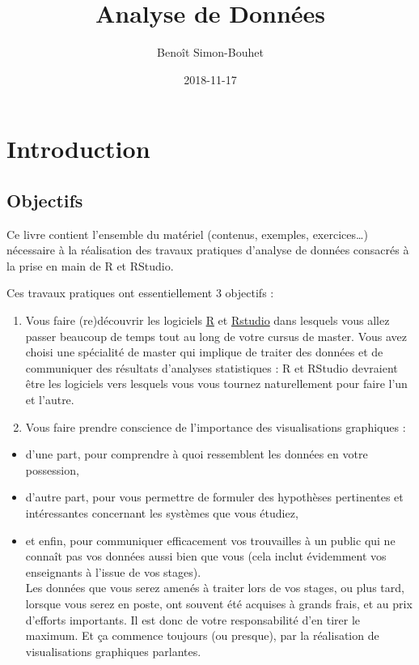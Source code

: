 \documentclass[a4paperpaper,]{article}
\title{Analyse de Données}
\author{Benoît Simon-Bouhet}
\date{2018-11-17}
\providecommand{\tightlist}{%
  \setlength{\itemsep}{0pt}\setlength{\parskip}{0pt}}
\theoremstyle{definition}
\theoremstyle{definition}
\theoremstyle{definition}
\theoremstyle{remark}
\begin{document}
\maketitle

{
\setcounter{tocdepth}{2}
\tableofcontents
}
\section{Introduction}\label{introduction}

\subsection{Objectifs}\label{objectifs}

Ce livre contient l'ensemble du matériel (contenus, exemples,
exercices\ldots{}) nécessaire à la réalisation des travaux pratiques
d'analyse de données consacrés à la prise en main de R et RStudio.

Ces travaux pratiques ont essentiellement 3 objectifs :

\begin{enumerate}
\def\labelenumi{\arabic{enumi}.}
\tightlist
\item
  Vous faire (re)découvrir les logiciels
  \href{https://cran.r-project.org}{R} et
  \href{https://www.rstudio.com}{Rstudio} dans lesquels vous allez
  passer beaucoup de temps tout au long de votre cursus de master. Vous
  avez choisi une spécialité de master qui implique de traiter des
  données et de communiquer des résultats d'analyses statistiques : R et
  RStudio devraient être les logiciels vers lesquels vous vous tournez
  naturellement pour faire l'un et l'autre.
\item
  Vous faire prendre conscience de l'importance des visualisations
  graphiques :
\end{enumerate}

\begin{itemize}
\tightlist
\item
  d'une part, pour comprendre à quoi ressemblent les données en votre
  possession,
\item
  d'autre part, pour vous permettre de formuler des hypothèses
  pertinentes et intéressantes concernant les systèmes que vous étudiez,
\item
  et enfin, pour communiquer efficacement vos trouvailles à un public
  qui ne connaît pas vos données aussi bien que vous (cela inclut
  évidemment vos enseignants à l'issue de vos stages).\\
  Les données que vous serez amenés à traiter lors de vos stages, ou
  plus tard, lorsque vous serez en poste, ont souvent été acquises à
  grands frais, et au prix d'efforts importants. Il est donc de votre
  responsabilité d'en tirer le maximum. Et ça commence toujours (ou
  presque), par la réalisation de visualisations graphiques parlantes.
\end{itemize}
\end{document}
